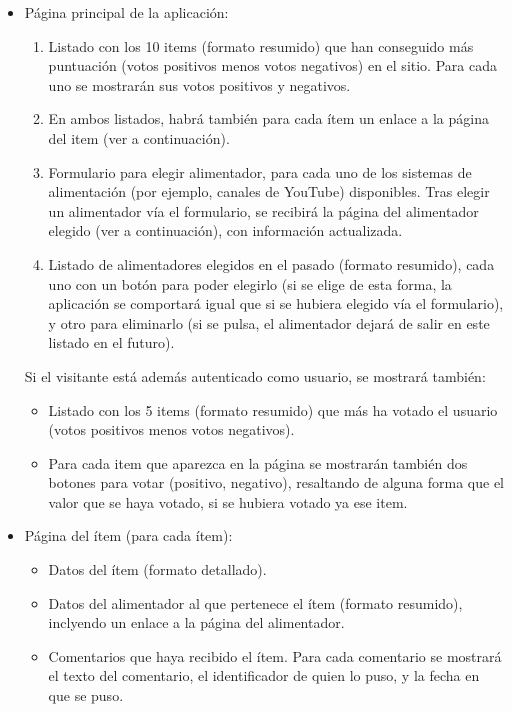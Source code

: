 \begin{itemize}
  \item Página principal de la aplicación:
  
    \begin{enumerate}
    \item Listado con los 10 items (formato resumido) que han conseguido más puntuación (votos positivos menos votos negativos) en el sitio. Para cada uno se mostrarán sus votos positivos y negativos.
    \item En ambos listados, habrá también para cada ítem un enlace a la página del item (ver a continuación).
    \item Formulario para elegir alimentador, para cada uno de los sistemas de alimentación (por ejemplo, canales de YouTube) disponibles. Tras elegir un alimentador vía el formulario, se recibirá la página del alimentador elegido (ver a continuación), con información actualizada.
    \item Listado de alimentadores elegidos en el pasado (formato resumido), cada uno con un botón para poder elegirlo (si se elige de esta forma, la aplicación se comportará igual que si se hubiera elegido vía el formulario), y otro para eliminarlo (si se pulsa, el alimentador dejará de salir en este listado en el futuro).
    \end{enumerate}

    Si el visitante está además autenticado como usuario, se mostrará también:

    \begin{itemize}
    \item Listado con los 5 items (formato resumido) que más ha votado el usuario (votos positivos menos votos negativos).
    \item Para cada item que aparezca en la página se mostrarán también dos botones para votar (positivo, negativo), resaltando de alguna forma que el valor que se haya votado, si se hubiera votado ya ese item.
    \end{itemize}

  \item Página del ítem (para cada ítem):

    \begin{itemize}
    \item Datos del ítem (formato detallado).
    \item Datos del alimentador al que pertenece el ítem (formato resumido), inclyendo un enlace a la página del alimentador.
    \item Comentarios que haya recibido el ítem. Para cada comentario se mostrará el texto del comentario, el identificador de quien lo puso, y la fecha en que se puso.
    \end{itemize}


\end{itemize}
